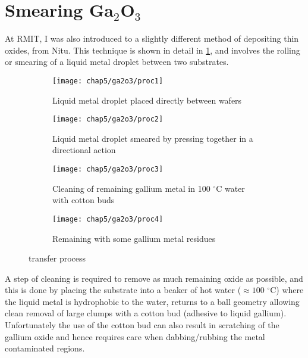 \documentclass[../Matt_Gebert_Honours_Thesis.tex]{subfiles}
\begin{document}
	\section{Smearing Ga$_2$O$_3$}\label{sec:smearing}
	At RMIT, I was also introduced to a slightly different method of depositing thin oxides, from Nitu. This technique is shown in detail  in \cref{fig:gallium_transfer_process}, and involves the rolling or smearing of a liquid metal droplet between two substrates.
	\begin{figure}[H]
		\begin{subfigure}{0.24\textwidth}
			\texttt{[image: chap5/ga2o3/proc1]}
			\caption{Liquid metal droplet placed directly between \silicondioxide{} wafers}
		\end{subfigure}
		\begin{subfigure}{0.24\textwidth}
			\texttt{[image: chap5/ga2o3/proc2]}
			\caption{Liquid metal droplet smeared by pressing \silicondioxide{} together in a directional action}
		\end{subfigure}
		\begin{subfigure}{0.24\textwidth}
			\texttt{[image: chap5/ga2o3/proc3]}
			\caption{Cleaning of remaining gallium metal in 100 $^\circ$C water with cotton buds}
		\end{subfigure}
		\begin{subfigure}{0.24\textwidth}
			\texttt{[image: chap5/ga2o3/proc4]}
			\caption{Remaining \galliumoxide{} with some gallium metal residues}
		\end{subfigure}
		\caption[\galliumoxide{} transfer process]{\galliumoxide{} transfer process}\label{fig:gallium_transfer_process}
	\end{figure}
	A step of cleaning is required to remove as much remaining oxide as possible, and this is done by placing the substrate into a beaker of hot water ($\approx 100$ $^\circ$C) where the liquid metal is hydrophobic to the water, returns to a ball geometry allowing clean removal of large clumps with a cotton bud (adhesive to liquid gallium). Unfortunately the use of the cotton bud can also result in scratching of the gallium oxide and hence requires care when dabbing/rubbing the metal contaminated regions.
	
\end{document}
